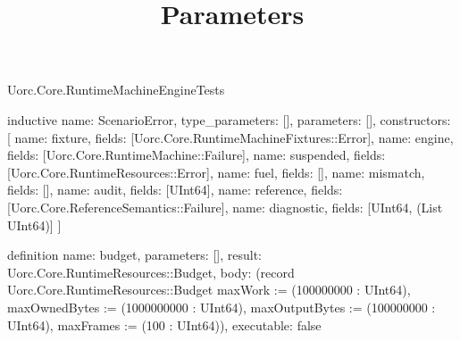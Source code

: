 \begin{lexlean}{Uorc.Core.RuntimeMachineEngineTests}
\title{Parameters}
\begin{semanticmodule}
inductive{
  name: ScenarioError,
  type_parameters: [],
  parameters: [],
  constructors: [
    {name: fixture, fields: [Uorc.Core.RuntimeMachineFixtures::Error]},
    {name: engine, fields: [Uorc.Core.RuntimeMachine::Failure]},
    {name: suspended, fields: [Uorc.Core.RuntimeResources::Error]},
    {name: fuel, fields: []},
    {name: mismatch, fields: []},
    {name: audit, fields: [UInt64]},
    {name: reference, fields: [Uorc.Core.ReferenceSemantics::Failure]},
    {name: diagnostic, fields: [UInt64, (List UInt64)]}
  ]
}

definition{
  name: budget,
  parameters: [],
  result: Uorc.Core.RuntimeResources::Budget,
  body: (record Uorc.Core.RuntimeResources::Budget {maxWork := (100000000 : UInt64), maxOwnedBytes := (1000000000 : UInt64), maxOutputBytes := (100000000 : UInt64), maxFrames := (100 : UInt64)}),
  executable: false
}


\end{semanticmodule}
\end{lexlean}
